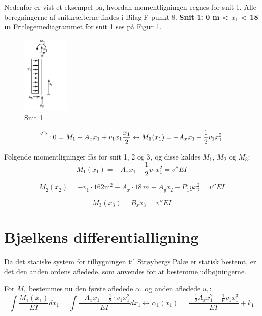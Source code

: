 Nedenfor er vist et eksempel på, hvordan momentligningen regnes for snit 1. Alle beregningerne af snitkræfterne findes i Bilag F punkt 8.
\newline
\newline
\textbf{Snit 1: 0 m < $x_1$ < 18 m}
\newline
Fritlegemediagrammet for snit 1 ses på Figur \ref{fig:snitetan}.
\begin{figure}[H]
	\centering
	\includegraphics[width=0.2\textwidth]{billeder/asnitet.png}
	\caption{Snit 1}
	\label{fig:snitetan}
\end{figure}
\begin{equation}
	\ALN{\text{ }}: 0 = M_1 + A_x x_1 + v_1x_1 \frac{x_1}{2} \leftrightarrow M_1(x_1)= {-A_x x_1-\frac{1}{2}v_1x_1^2}
\end{equation}

Følgende momentligninger fås for snit 1, 2 og 3, og disse kaldes $M_1$, $M_2$ og $M_3$:
\begin{equation}
	M_1(x_1)= -A_x x_1-\frac{1}{2}v_1x_1^2 = v''EI
\end{equation}

\begin{equation}
	M_2(x_2)= -v_1 \cdot 162 \text{m}^2 - A_x \cdot \SI{18}{m} + A_yx_2 - P_1y x_2^2 = v''EI
\end{equation}

\begin{equation}
	M_3(x_3)= B_xx_3 = v''EI
\end{equation}

\section{Bjælkens differentialligning}
Da det statiske system for tilbygningen til Strøybergs Palæ er statisk bestemt, er det den anden ordens afledede, som anvendes for at bestemme udbøjningerne.

For $M_1$ bestemmes nu den første afledede $\alpha_1$ og anden afledede $u_1$: %
\begin{equation}
	\int \frac{M_1(x_1)}{EI} dx_1 = \int \frac{-A_x x_1 - \frac{1}{2}\cdot v_1 x_1^2}{EI} dx_1
	\leftrightarrow \alpha_1(x_1) = \frac{-\frac{1}{2} A_x x_1^2 - \frac{1}{6}  v_1  x_1^3 }{EI} + k_1
\end{equation}

